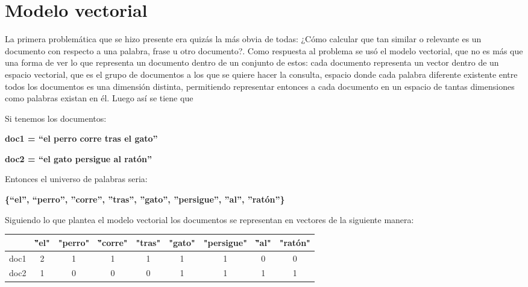\documentclass[10pt]{article}
\begin{document}
\section{Modelo vectorial}
\label{sec:model}

La primera problemática que se hizo presente era quizás la más obvia de todas: ¿Cómo calcular que tan similar o relevante es un documento con respecto a una palabra, frase u otro documento?. Como respuesta al problema se usó el modelo vectorial, que no es más que una forma de ver lo que representa un documento dentro de un conjunto de estos: cada documento representa un vector dentro de un espacio vectorial, que es el grupo de documentos a los que se quiere hacer la consulta, espacio donde cada palabra diferente existente entre todos los documentos es una dimensión distinta, permitiendo representar entonces a cada documento en un espacio de tantas dimensiones como palabras existan en él. Luego así se tiene que

\vspace*{.2cm}

Si tenemos los documentos:

\begin{center}	
	\colorbox[RGB]{200,200,200}{
		\parbox[c][1.25cm]{10cm}{
			\begin{center}
				\textcolor[RGB]{50,50,50}{\bfseries doc1 = “el perro corre tras el gato” }
	
				\textcolor[RGB]{50,50,50}{\bfseries doc2 = “el gato persigue al ratón” }
			\end{center}
		}
	}
\end{center}
Entonces el universo de palabras seria:

\begin{center}	
	\colorbox[RGB]{200,200,200}{
		\parbox[c][1.25cm]{11cm}{
			\begin{center}
				\textcolor[RGB]{50,50,50}{\bfseries \{“el”, “perro”, ”corre”, ”tras”, ”gato”, ”persigue”, ”al”, ”ratón”\} }
			\end{center}
		}
	}
\end{center}
Siguiendo lo que plantea el modelo vectorial los documentos se representan en
vectores de la siguiente manera:

\renewcommand{\arraystretch}{1.5}

\begin{table}[h]
	\centering
	\bfseries \textcolor[RGB]{50,50,50}{
		\begin{tabular}{|c|c|c|c|c|c|c|c|c|}
			\hline
			\rowcolor[RGB]{200,200,200}
			& \""el" & "perro" & \""corre" & "tras" & "gato" & "persigue" & \""al" & "ratón" \\
			\hline
			\rowcolor[RGB]{200,200,200}
			doc1 & 2 & 1 & 1 & 1 & 1 & 1 & 0 & 0 \\
			\hline
			\rowcolor[RGB]{200,200,200}
			doc2 & 1 & 0 & 0 & 0 & 1 & 1 & 1 & 1 \\
			\hline
		\end{tabular}
	}
\end{table}
\end{document}
